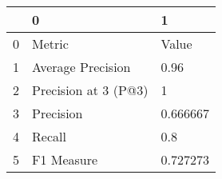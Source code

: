 \begin{tabular}{lll}
\toprule
{} &                     0 &         1 \\
\midrule
0 &                Metric &     Value \\
1 &     Average Precision &      0.96 \\
2 &  Precision at 3 (P@3) &         1 \\
3 &             Precision &  0.666667 \\
4 &                Recall &       0.8 \\
5 &            F1 Measure &  0.727273 \\
\bottomrule
\end{tabular}
